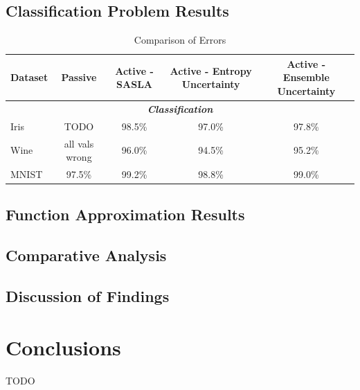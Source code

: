 \documentclass[10pt, conference]{IEEEtran}
\begin{document}
\subsection{Classification Problem Results}
\begin{table}[ht]
	\caption{Comparison of Errors}
	\label{tab:comparison}
	\centering
	\begin{tabular}{|l|c|c|c|c|}
		\hline
		\textbf{Dataset} & \textbf{Passive} & \textbf{Active - SASLA} & \textbf{Active - Entropy Uncertainty} & \textbf{Active - Ensemble Uncertainty} \\
		\hline
		\multicolumn{5}{|c|}{\textbf{\textit{Classification}}} \\
		\hline
		Iris & TODO & 98.5\% & 97.0\% & 97.8\% \\
		Wine & all vals wrong & 96.0\% & 94.5\% & 95.2\% \\
		MNIST & 97.5\% & 99.2\% & 98.8\% & 99.0\% \\
		\hline
	\end{tabular}
\end{table}


\subsection{Function Approximation Results}

\subsection{Comparative Analysis}


\subsection{Discussion of Findings}

\section{Conclusions}
TODO



\end{document}
